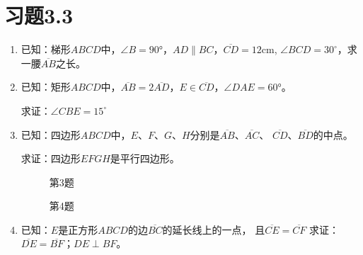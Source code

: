 \section*{习题3.3}
\begin{enumerate}
    \item 已知：梯形$ABCD$中，$\angle B=\ang{90}$，$AD\parallel BC$，$\overline{CD}=12$cm, $\angle BCD=30^{\circ}$，求一腰$\overline{AB}$之长。
\item 已知：矩形$ABCD$中，$\overline{AB}=2\overline{AD}$，$E\in \overline{CD}$，$\angle DAE=\ang{60}$。

求证：$\angle CBE=15^{\circ}$
\item 已知：四边形$ABCD$中，$E$、$F$、$G$、$H$分别是$\overline{AB}$、$\overline{AC}$、
$\overline{CD}$、$\overline{BD}$的中点。

求证：四边形$EFGH$是平行四边形。
\begin{figure}
    \begin{minipage}[t]{0.48\linewidth}
    \centering
\begin{tikzpicture}[>=latex, scale=1]
    \end{tikzpicture}
    \caption*{第3题}
    \end{minipage}
    \begin{minipage}[t]{0.48\linewidth}
    \centering
    \begin{tikzpicture}[>=latex, scale=1.4]
    \end{tikzpicture}
    \caption*{第4题}
    \end{minipage}
    \end{figure}

\item 已知：$E$是正方形$ABCD$的边$\overline{BC}$的延长线上的一点，
且$\overline{CE}=\overline{CF}$
求证：$\overline{DE}=\overline{BF}$；$DE\perp BF$。


\end{enumerate}
